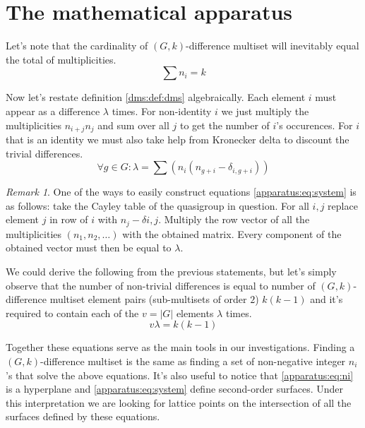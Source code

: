 \documentclass{article}
\theoremstyle{plain}
\theoremstyle{definition}
\theoremstyle{remark}
\newtheorem{remark}[theorem]{Remark}
\begin{document}
	\section{The mathematical apparatus}
		Let's note that the cardinality of $(G,k)$-difference multiset will inevitably equal the total of multiplicities.
		\begin{equation}
			\label{apparatus:eq:ni}
			\sum {n_i} = k
		\end{equation}
		
		Now let's restate definition \ref{dms:def:dms} algebraically. Each element $i$ must appear as a difference $\lambda$ times. For non-identity $i$ we just multiply the multiplicities $n_{i+j} n_j$ and sum over all $j$ to get the number of $i$'s occurences. For $i$ that is an identity we must also take help from Kronecker delta to discount the trivial differences.
		\begin{equation}
			\label{apparatus:eq:system}
			\forall g \in G \colon \lambda = \sum (n_i(n_{g+i}-\delta_{i,g+i}))
		\end{equation}
		
		
		\begin{remark}
			One of the ways to easily construct equations \eqref{apparatus:eq:system} is as follows: take the Cayley table of the quasigroup in question. For all $i,j$ replace element $j$ in row of $i$ with $n_j-\delta{i,j}$. Multiply the row vector of all the multiplicities $(n_1,n_2,\ldots)$ with the obtained matrix. Every component of the obtained vector must then be equal to $\lambda$.
		\end{remark}
		
		We could derive the following from the previous statements, but let's simply observe that the number of non-trivial differences is equal to number of $(G,k)$-difference multiset element pairs (sub-multisets of order $2$) $k(k-1)$ and it's required to contain each of the $v=|G|$ elements $\lambda$ times.
		\begin{equation}
			\label{apparatus:eq:parameters}
			v\lambda = k(k-1)
		\end{equation}
		
		Together these equations serve as the main tools in our investigations. Finding a $(G,k)$-difference multiset is the same as finding a set of non-negative integer $n_i$'s that solve the above equations. It's also useful to notice that \eqref{apparatus:eq:ni} is a hyperplane and \eqref{apparatus:eq:system} define second-order surfaces. Under this interpretation we are looking for lattice points on the intersection of all the surfaces defined by these equations.
		
\end{document}
